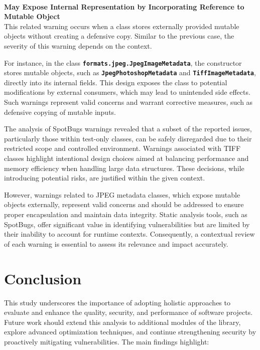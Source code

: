 \documentclass[sigconf]{acmart}
\begin{document}
{\hfill\\
{\textbf{May Expose Internal Representation by Incorporating Reference to Mutable Object}}
\hfill\\

This related warning occurs when a class stores externally provided mutable objects without creating a defensive copy. Similar to the previous case, the severity of this warning depends on the context.

For instance, in the class \textbf{\texttt{formats.jpeg.JpegImageMetadata}}, the constructor stores mutable objects, such as \textbf{\texttt{JpegPhotoshopMeta\allowbreak data}} and \textbf{\texttt{TiffImageMetadata}}, directly into its internal fields. This design exposes the class to potential modifications by external consumers, which may lead to unintended side effects. Such warnings represent valid concerns and warrant corrective measures, such as defensive copying of mutable inputs.

The analysis of SpotBugs warnings revealed that a subset of the reported issues, particularly those within test-only classes, can be safely disregarded due to their restricted scope and controlled environment. Warnings associated with TIFF classes highlight intentional design choices aimed at balancing performance and memory efficiency when handling large data structures. These decisions, while introducing potential risks, are justified within the given context.

However, warnings related to JPEG metadata classes, which expose mutable objects externally, represent valid concerns and should be addressed to ensure proper encapsulation and maintain data integrity.
Static analysis tools, such as SpotBugs, offer significant value in identifying vulnerabilities but are limited by their inability to account for runtime contexts.  Consequently, a contextual review of each warning is essential to assess its relevance and impact accurately.
\newpage

\section{Conclusion}

This study underscores the importance of adopting holistic approaches to evaluate and enhance the quality, security, and performance of software projects. Future work should extend this analysis to additional modules of the library, explore advanced optimization techniques, and continue strengthening security by proactively mitigating vulnerabilities. The main findings highlight:
\hfill\\\hfill\\

}
\end{document}
